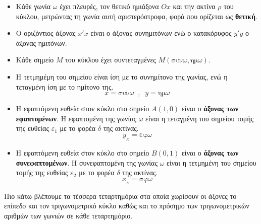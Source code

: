 \documentclass[twoside,nofonts,internet,shmeiwseis]{thewria}
\newcommand{\hm}[1]{\textrm{ημ}#1}
\newcommand{\syn}[1]{\textrm{συν}#1}
\newcommand{\ef}[1]{\textrm{εφ}#1}
\newcommand{\syf}[1]{\textrm{σφ}#1}
\begin{document}
\begin{itemize}[itemsep=0mm]
\item Κάθε γωνία $ \omega $ έχει πλευρές, τον θετικό ημιάξονα $ Ox $ και την ακτίνα $ \rho $ του κύκλου, μετρώντας τη γωνία αυτή αριστερόστροφα, φορά που ορίζεται ως \textbf{θετική}.
\item Ο οριζόντιος άξονας $ x'x $ είναι ο άξονας συνημιτόνων ενώ ο κατακόρυφος $ y'y $ ο άξονας ημιτόνων.
\item Κάθε σημείο $ M $ του κύκλου έχει συντεταγμένες $ M(\syn{\omega},\hm{\omega}) $.
\item Η τετμημέμη του σημείου είναι ίση με το συνημίτονο της γωνίας, ενώ η τεταγμένη ίση με το ημίτονο της.
\[ x=\syn{\omega}\;\;,\;\;y=\hm{\omega} \]
\item Η εφαπτόμενη ευθεία στον κύκλο στο σημείο $ A(1,0) $ είναι ο \textbf{άξονας των εφαπτομένων}. Η εφαπτομένη της γωνίας $ \omega $ είναι η τεταγμένη του σημείου τομής της ευθείας $ \varepsilon_1 $ με το φορέα $ \delta $ της ακτίνας.
\[ y_{\!_K}=\ef{\omega} \]
\item Η εφαπτόμενη ευθεία στον κύκλο στο σημείο $ B(0,1) $ είναι ο \textbf{άξονας των συνεφαπτομένων}. Η συνεφαπτομένη της γωνίας $ \omega $ είναι η τετμημένη του σημείου τομής της ευθείας $ \varepsilon_2 $ με το φορέα $ \delta $ της ακτίνας.
\[ x_{\!_K}=\syf{\omega} \]	
\end{itemize}
Πιο κάτω βλέπουμε τα τέσσερα τεταρτημόρια στα οποία χωρίσουν οι άξονες το επίπεδο και τον τριγωνομετρικό κύκλο καθώς και το πρόσημο των τριγωνομετρικών αριθμών των γωνιών σε κάθε τεταρτημόριο.
\end{document}
